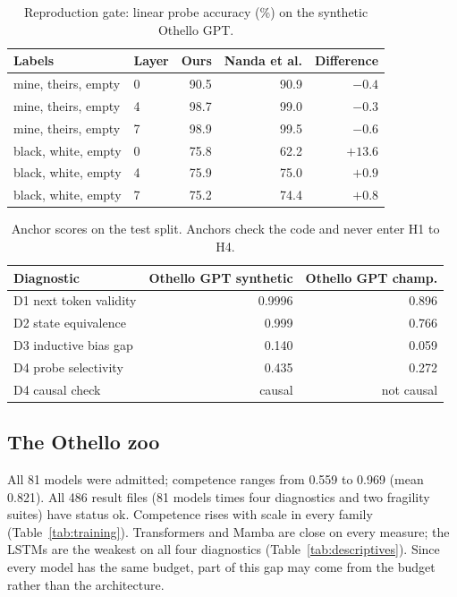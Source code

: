 \documentclass[journal]{IEEEtran}
\begin{document}
\begin{table}[t]
    \centering
    \caption{Reproduction gate: linear probe accuracy (\%) on the synthetic Othello GPT.}
    \label{tab:repro}
    \footnotesize
    \begin{tabular}{llrrr}
    \toprule
    Labels & Layer & Ours & Nanda et al. & Difference \\
    \midrule
    mine, theirs, empty & 0 & 90.5 & 90.9 & $-0.4$ \\
    mine, theirs, empty & 4 & 98.7 & 99.0 & $-0.3$ \\
    mine, theirs, empty & 7 & 98.9 & 99.5 & $-0.6$ \\
    black, white, empty & 0 & 75.8 & 62.2 & $+13.6$ \\
    black, white, empty & 4 & 75.9 & 75.0 & $+0.9$ \\
    black, white, empty & 7 & 75.2 & 74.4 & $+0.8$ \\
    \bottomrule
    \end{tabular}
\end{table}

\begin{table}[t]
    \centering
    \caption{Anchor scores on the test split. Anchors check the code and never enter H1 to H4.}
    \label{tab:anchors}
    \footnotesize
    \setlength{\tabcolsep}{4pt}
    \begin{tabular}{lrr}
    \toprule
    Diagnostic & Othello GPT synthetic & Othello GPT champ. \\
    \midrule
    D1 next token validity & 0.9996 & 0.896 \\
    D2 state equivalence & 0.999 & 0.766 \\
    D3 inductive bias gap & 0.140 & 0.059 \\
    D4 probe selectivity & 0.435 & 0.272 \\
    D4 causal check & causal & not causal \\
    \bottomrule
    \end{tabular}
\end{table}

\subsection{The Othello zoo}
\label{sec:zoo}
All 81 models were admitted; competence ranges from 0.559 to 0.969 (mean 0.821). All 486 result files (81 models
times four diagnostics and two fragility suites) have status ok. Competence rises with scale in every family
(Table~\ref{tab:training}). Transformers and Mamba are close on every measure; the LSTMs are the weakest on all four
diagnostics (Table~\ref{tab:descriptives}). Since every model has the same budget, part of this gap may come from the
budget rather than the architecture.
\end{document}
